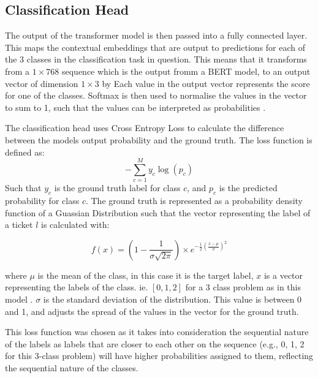\documentclass{UoYCSproject}
\begin{document}
    \subsection{Classification Head}\label{subsec:Classification-Head}
    The output of the transformer model is then passed into a fully connected layer.
    This maps the contextual embeddings that are output to predictions for each of the 3 classes in the classification task in question.
    This means that it transforms from a $1\times768$ sequence which is the output fromm a BERT model, to an output vector of dimension $1\times3$ by
    Each value in the output vector represents the score for one of the classes.
    Softmax is then used to normalise the values in the vector to sum to 1, such that the values can be interpreted as probabilities \cite[p.~809]{russel2010}.

    The classification head uses Cross Entropy Loss to calculate the difference between the models output probability and the ground truth.
    The loss function is defined as:
    \[-\sum_{c=1}^My_{c}\log(p_{c})\]
    Such that $y_{c}$ is the ground truth label for class $c$, and $p_{c}$ is the predicted probability for class $c$.
    The ground truth is represented as a probability density function of a Guassian Distribution such that the vector representing the label of a ticket $l$ is calculated with:

    \[f(x) = (1-\frac{1}{\sigma \sqrt {2\pi}}) \times e ^{-\frac{1}{2}(\frac{x-\mu }{\sigma})^{2}}\]

    where $\mu$ is the mean of the class, in this case it is the target label, $x$ is a vector representing the labels of the class. ie. $[0,1,2]$ for a 3 class problem as in this model .
    $\sigma$ is the standard deviation of the distribution.
    This value is between 0 and 1, and adjusts the spread of the values in the vector for the ground truth.

    This loss function was chosen as it takes into consideration the sequential nature of the labels as labels that are closer to each other on the sequence (e.g., 0, 1, 2 for this 3-class problem) will have higher probabilities assigned to them, reflecting the sequential nature of the classes.
\end{document}

